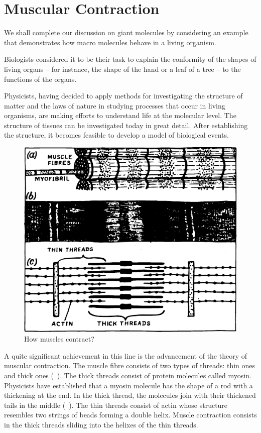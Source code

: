 \section{Muscular Contraction}

We shall complete our discussion on giant molecules by considering an example that demonstrates how macro­ molecules behave in a living organism.

Biologists considered it to be their task to explain the conformity of the shapes of living organs -- for instance, the shape of the hand or a leaf of a tree -- to the functions of the organs.

Physicists, having decided to apply methods for in­vestigating the structure of matter and the laws of nature in studying processes that occur in living organisms, are making efforts to understand life at the molecular level. The structure of tissues can be investigated today in great detail. After establishing the structure, it becomes feasible to develop a model of biological events.
\begin{figure}[!ht]
\centering
\includegraphics[width=\textwidth]{figures/fig-09-07.pdf}
\caption{How muscles contract?}
\label{fig-9.7}
\end{figure}

A quite significant achievement in this line is the advance­ment of the theory of muscular contraction. The mus­cle fibre consists of two types of threads: thin ones and thick ones (~). The thick threads consist of pro­tein molecules called myosin. Physicists have estab­lished that a myosin molecule has the shape of a rod with a thickening at the end. In the thick thread, the mole­cules join with their thickened tails in the middle (~). The thin threads consist of actin whose structure resembles two strings of beads forming a double helix. Muscle contraction consists in the thick threads sliding into the helixes of the thin threads.


